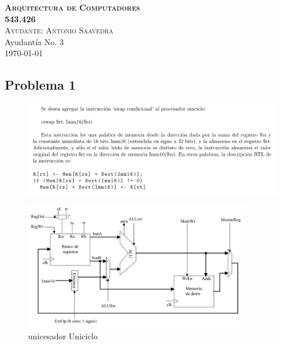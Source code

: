 \documentclass[letterpaper,11pt,notitlepage]{article}
\begin{document}

\begin{center}
\textsc{ \huge \bfseries Arquitectura de Computadores\\[0.2cm] 543.426}\\[0.2cm]
\textsc{ Ayudante: Antonio Saavedra}\\[0.2cm]
Ayudantía No. 3\\

\today
\end{center}



\subsection*{Problema 1}

\begin{figure}[H]
\begin{center}
\includegraphics[width=\textwidth]{1.png}
\end{center}
\end{figure}
\begin{figure}[H]
\begin{center}
\includegraphics[width=0.88\textwidth,keepaspectratio=true]{unic}
\end{center}
\caption{unicesador Uniciclo}
\end{figure}
\end{document}
